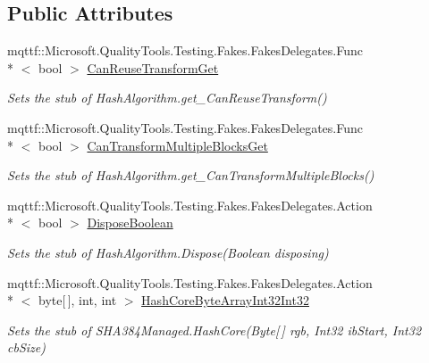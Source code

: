 \subsection*{Public Attributes}
\begin{DoxyCompactItemize}
\item 
mqttf\-::\-Microsoft.\-Quality\-Tools.\-Testing.\-Fakes.\-Fakes\-Delegates.\-Func\\*
$<$ bool $>$ \hyperlink{class_system_1_1_security_1_1_cryptography_1_1_fakes_1_1_stub_s_h_a384_managed_a5a3487713870d6d73d7aa7344dff7645}{Can\-Reuse\-Transform\-Get}
\begin{DoxyCompactList}\small\item\em Sets the stub of Hash\-Algorithm.\-get\-\_\-\-Can\-Reuse\-Transform()\end{DoxyCompactList}\item 
mqttf\-::\-Microsoft.\-Quality\-Tools.\-Testing.\-Fakes.\-Fakes\-Delegates.\-Func\\*
$<$ bool $>$ \hyperlink{class_system_1_1_security_1_1_cryptography_1_1_fakes_1_1_stub_s_h_a384_managed_ae20bd75a32dbad311fd540c71f2b4c44}{Can\-Transform\-Multiple\-Blocks\-Get}
\begin{DoxyCompactList}\small\item\em Sets the stub of Hash\-Algorithm.\-get\-\_\-\-Can\-Transform\-Multiple\-Blocks()\end{DoxyCompactList}\item 
mqttf\-::\-Microsoft.\-Quality\-Tools.\-Testing.\-Fakes.\-Fakes\-Delegates.\-Action\\*
$<$ bool $>$ \hyperlink{class_system_1_1_security_1_1_cryptography_1_1_fakes_1_1_stub_s_h_a384_managed_aa16713bf4b52958334f609c11f92a866}{Dispose\-Boolean}
\begin{DoxyCompactList}\small\item\em Sets the stub of Hash\-Algorithm.\-Dispose(\-Boolean disposing)\end{DoxyCompactList}\item 
mqttf\-::\-Microsoft.\-Quality\-Tools.\-Testing.\-Fakes.\-Fakes\-Delegates.\-Action\\*
$<$ byte\mbox{[}$\,$\mbox{]}, int, int $>$ \hyperlink{class_system_1_1_security_1_1_cryptography_1_1_fakes_1_1_stub_s_h_a384_managed_a6cb567c52f6180ad62efa2d4a14d6e2a}{Hash\-Core\-Byte\-Array\-Int32\-Int32}
\begin{DoxyCompactList}\small\item\em Sets the stub of S\-H\-A384\-Managed.\-Hash\-Core(\-Byte\mbox{[}$\,$\mbox{]} rgb, Int32 ib\-Start, Int32 cb\-Size)\end{DoxyCompactList}\item 

\end{DoxyCompactItemize}
